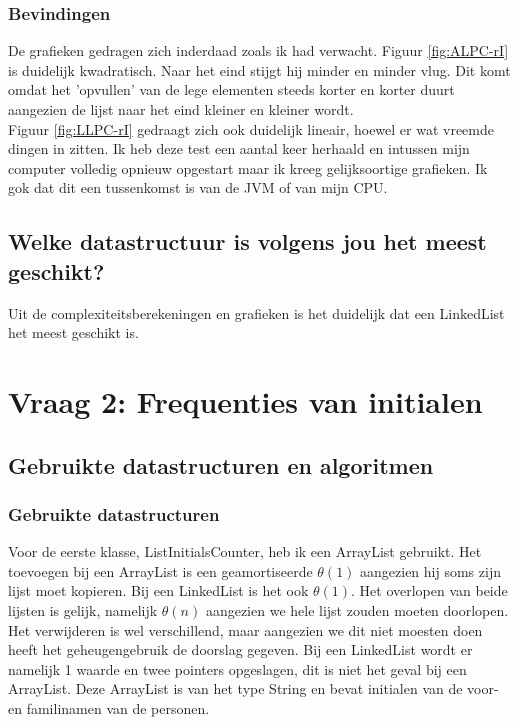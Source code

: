 \documentclass[10pt,a4paper]{report}
\begin{document}
\subsubsection*{Bevindingen}
De grafieken gedragen zich inderdaad zoals ik had verwacht. Figuur \ref{fig:ALPC-rI} is duidelijk kwadratisch. Naar het eind stijgt hij minder en minder vlug. Dit komt omdat het 'opvullen' van de lege elementen steeds korter en korter duurt aangezien de lijst naar het eind kleiner en kleiner wordt.\\
Figuur \ref{fig:LLPC-rI} gedraagt zich ook duidelijk lineair, hoewel er wat vreemde dingen in zitten. Ik heb deze test een aantal keer herhaald en intussen mijn computer volledig opnieuw opgestart maar ik kreeg gelijksoortige grafieken. Ik gok dat dit een tussenkomst is van de JVM of van mijn CPU.

\subsection*{Welke datastructuur is volgens jou het meest geschikt?}
Uit de complexiteitsberekeningen en grafieken is het duidelijk dat een LinkedList het meest geschikt is.



\section*{Vraag 2: Frequenties van initialen}
\subsection*{Gebruikte datastructuren en algoritmen}
\subsubsection*{Gebruikte datastructuren}
Voor de eerste klasse, ListInitialsCounter, heb ik een ArrayList gebruikt. Het toevoegen bij een ArrayList is een geamortiseerde $\theta(1)$ aangezien hij soms zijn lijst moet kopieren. Bij een LinkedList is het ook $\theta(1)$. Het overlopen van beide lijsten is gelijk, namelijk $\theta(n)$ aangezien we hele lijst zouden moeten doorlopen. Het verwijderen is wel verschillend, maar aangezien we dit niet moesten doen heeft het geheugengebruik de doorslag gegeven. Bij een LinkedList wordt er namelijk 1 waarde en twee pointers opgeslagen, dit is niet het geval bij een ArrayList. Deze ArrayList is van het type String en bevat initialen van de voor- en familinamen van de personen.\\
\end{document}
